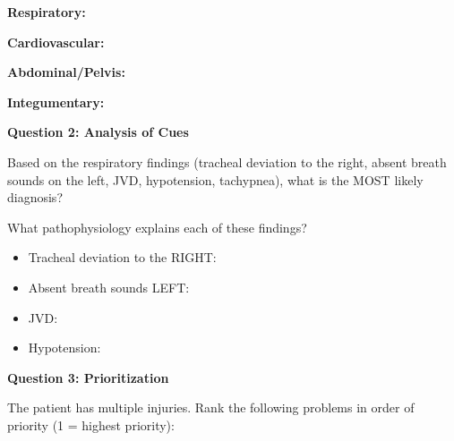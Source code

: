 \documentclass[11pt]{article}
\begin{document}
\underline{\hspace{12cm}}

\vspace{0.3cm}
\textbf{Respiratory:}

\underline{\hspace{12cm}}

\underline{\hspace{12cm}}

\vspace{0.3cm}
\textbf{Cardiovascular:}

\underline{\hspace{12cm}}

\underline{\hspace{12cm}}

\vspace{0.3cm}
\textbf{Abdominal/Pelvis:}

\underline{\hspace{12cm}}

\vspace{0.3cm}
\textbf{Integumentary:}

\underline{\hspace{12cm}}

\vspace{0.5cm}
\textbf{Question 2: Analysis of Cues}

Based on the respiratory findings (tracheal deviation to the right, absent breath sounds on the left, JVD, hypotension, tachypnea), what is the MOST likely diagnosis?

\underline{\hspace{10cm}}

What pathophysiology explains each of these findings?

\begin{itemize}
    \item Tracheal deviation to the RIGHT: \underline{\hspace{6cm}}
    \item Absent breath sounds LEFT: \underline{\hspace{6cm}}
    \item JVD: \underline{\hspace{6cm}}
    \item Hypotension: \underline{\hspace{6cm}}
\end{itemize}

\vspace{0.5cm}
\textbf{Question 3: Prioritization}

The patient has multiple injuries. Rank the following problems in order of priority (1 = highest priority):
\end{document}
